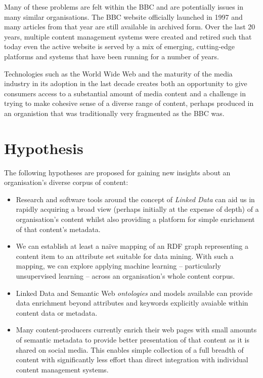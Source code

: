 Many of these problems are felt within the BBC and are potentially
issues in many similar organisations. The BBC website officially
launched in 1997 and many articles from that year are still available
in archived form. Over the last 20 years, multiple content management
systems were created and retired such that today even the active
website is served by a mix of emerging, cutting-edge platforms and
systems that have been running for a number of years.

Technologies such as the World Wide Web and the maturity of the
media industry in its adoption in the last decade creates both an
opportunity to give consumers access to a substantial amount of
media content and a challenge in trying to make cohesive sense of
a diverse range of content, perhaps produced in an organistion that
was traditionally very fragmented as the BBC was.

\section{Hypothesis}

The following hypotheses are proposed for gaining new insights about
an organisation's diverse corpus of content:

\begin{itemize}

\item Research and software tools around the concept of
  \emph{Linked Data} can aid us in rapidly acquiring a broad view
  (perhaps initially at the expense of depth) of a organisation's
  content whilst also providing a platform for simple enrichment of
  that content's metadata.

\item We can establish at least a na\"ive mapping of an RDF graph
  representing a content item to an attribute set suitable for data
  mining. With such a mapping, we can explore applying machine
  learning -- particularly unsupervised learning -- across an
  organisation's whole content corpus.

\item Linked Data and Semantic Web \emph{ontologies} and models
  available can provide data enrichment beyond attributes and keywords
  explicitly avaiable within content data or metadata.

\item Many content-producers currently enrich their web pages with
  small amounts of semantic metadata to provide better presentation of
  that content as it is shared on social media. This enables simple
  collection of a full breadth of content with significantly less
  effort than direct integration with individual content management
  systems.

\end{itemize}


